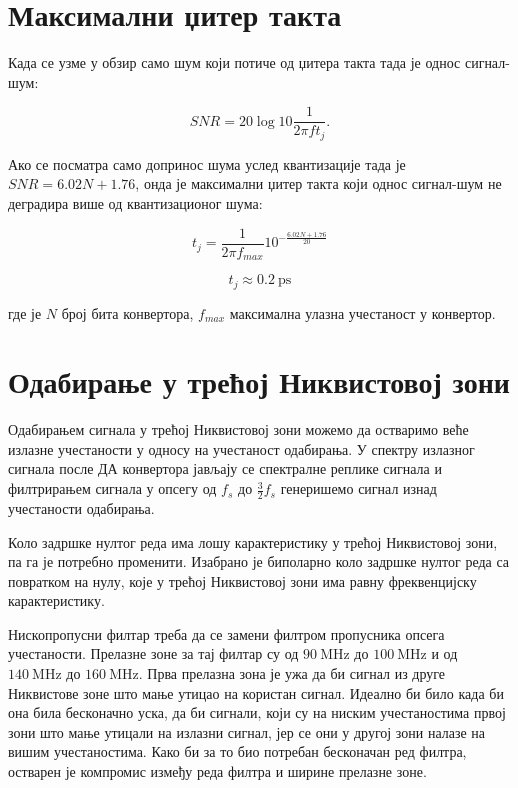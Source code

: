 \documentclass[conference]{IEEEJERM}
\begin{document}
\section{Максимални џитер такта}

Када се узме у обзир само шум који потиче од џитера такта тада је однос сигнал-шум:

\begin{equation}
SNR=20\log10\frac{1}{2\pi f t_j}.
\end{equation}


Ако се посматра само допринос шума услед квантизације тада је $SNR = 6.02N + 1.76$, онда је максимални џитер такта који однос сигнал-шум не деградира више од квантизационог шума:

\begin{equation}
t_j = \frac{1}{2 \pi f_{max}} 10^{-\frac{6.02N +1.76}{20}}
\end{equation}

\begin{equation}
t_j \approx  \SI{0.2}{\pico\s}
\end{equation}

\noindent где је $N$ број бита конвертора,  $f_{max}$ максимална улазна учестаност у конвертор.

\section{Одабирање у трећој Никвистовој зони}

Одабирањем сигнала у трећој Никвистовој зони можемо да остваримо веће излазне учестаности у односу на учестаност одабирања.
 У спектру излазног сигнала после ДА конвертора јављају се спектралне реплике сигнала и филтрирањем сигнала 
 у опсегу од $f_s$ до $\frac{3}{2} f_s $ генеришемо сигнал изнад учестаности одабирања.

Коло задршке нултог реда има лошу карактеристику у трећој Никвистовој зони, па га је потребно променити. 
Изабрано је биполарно коло задршке нултог реда са повратком на нулу, које у трећој Никвистовој зони има равну фреквенцијску карактеристику.

Нископропусни филтар треба да се замени филтром пропусника опсега учестаности. 
Прелазне зоне за тај филтар су од $\SI{90}{\mega\hertz}$ до $\SI{100}{\mega\hertz}$ и од $\SI{140}{\mega\hertz}$ до $\SI{160}{\mega\hertz}$.
Прва прелазна зона је ужа да би сигнал из друге Никвистове зоне што мање утицао на користан сигнал.
Идеално би било када би она била бесконачно уска, да би сигнали, који су на ниским учестаностима првој зони што мање утицали на излазни сигнал,
јер се они у другој зони налазе на вишим учестаностима. Како би за то био потребан бесконачан ред филтра, остварен је компромис између реда филтра
и ширине прелазне зоне.
\end{document}
